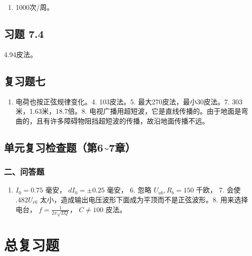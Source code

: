 \begin{enumerate}
\def\labelenumi{\arabic{enumi}.}
\setcounter{enumi}{2}
\tightlist
\item
  1000次/周。
\end{enumerate}

\subsection{习题 7.4}\label{ux4e60ux9898-7.4-1}

4.94皮法。

\subsection{复习题七}\label{ux590dux4e60ux9898ux4e03-1}

\begin{enumerate}
\def\labelenumi{\arabic{enumi}.}
\setcounter{enumi}{2}
\tightlist
\item
  电荷也按正弦规律变化。4. 103皮法。5. 最大270皮法，最小30皮法。7.
  303米，1.63米，18.7倍。8.
  电视广播用超短波，它是直线传播的。由于地面是弯曲的，且有许多障碍物阻挡超短波的传播，故沿地面传播不远。
\end{enumerate}

\subsection{单元复习检查题（第6\textasciitilde7章）}\label{ux5355ux5143ux590dux4e60ux68c0ux67e5ux9898ux7b2c67ux7ae0}

\subsubsection{二、问答题}\label{ux4e8cux95eeux7b54ux9898}

\begin{enumerate}
\def\labelenumi{\arabic{enumi}.}
\setcounter{enumi}{4}
\tightlist
\item
  \(I_{0} = 0.75\) 毫安， \(dI_{0} = \pm 0.25\) 毫安， 6. 忽略
  \(U_{ab}, R_{b} = 150\) 千欧， 7. 会使 .482\(U_{e0}\)
  太小，造成输出电压波形下面成为平顶而不是正弦波形。8. 用来选择电台，
  \(f=\frac{1}{2\pi\sqrt{LQ}}\)， \(C\neq100\) 皮法。
\end{enumerate}

\section{总复习题}\label{ux603bux590dux4e60ux9898-1}

